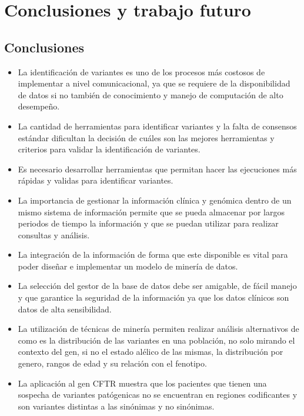\chapter{Conclusiones y trabajo futuro}

\section{Conclusiones}

\begin{itemize}
	\item La identificación de variantes es uno de los procesos más costosos de implementar a nivel comunicacional, ya que se requiere de la disponibilidad de datos si no también de conocimiento y manejo de computación de alto desempeño.
	
	\item La cantidad de herramientas para identificar variantes y la falta de consensos estándar dificultan la decisión de cuáles son las mejores herramientas y criterios para validar la identificación de variantes.
	
	\item Es necesario desarrollar herramientas que permitan hacer las ejecuciones más rápidas y validas para identificar variantes. 
	
	\item La importancia de gestionar la información clínica y genómica dentro de un mismo sistema de información permite que se pueda almacenar por largos periodos de tiempo la información y  que se puedan utilizar para realizar consultas y análisis. 
	
	\item La integración de la información de forma que este disponible es vital para poder diseñar e implementar un modelo de minería de datos.
	
	\item La selección del gestor de la base de datos debe ser amigable, de fácil manejo y que garantice la seguridad de la información ya que los datos clínicos son datos de alta sensibilidad.
	
	\item La utilización de técnicas de minería permiten realizar análisis alternativos de como es la distribución de las variantes en una población, no solo mirando el contexto del gen, si no el estado alélico de las mismas, la distribución por genero, rangos de edad y su relación con el fenotipo.
	
	\item La aplicación al gen CFTR muestra que los pacientes que tienen una sospecha de variantes patógenicas no se encuentran en regiones codificantes y son variantes distintas a las sinónimas y no sinónimas.
	

\end{itemize}
